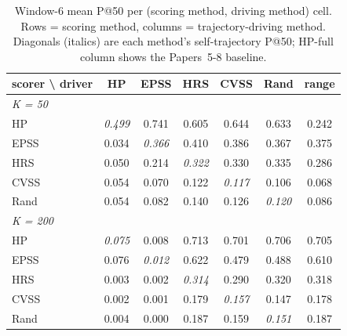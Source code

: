 \begin{table}[!t]
 \caption{Window-6 mean P@50 per (scoring method, driving method) cell. Rows = scoring method, columns = trajectory-driving method. Diagonals (italics) are each method's self-trajectory P@50; HP-full column shows the Papers~5-8 baseline.}
 \label{tab:w6grid}
 \centering
 \small
 \setlength{\tabcolsep}{5pt}
 \begin{tabular}{l ccccc c}
 \toprule
 \textbf{scorer} \textbackslash{} \textbf{driver}
 & HP & EPSS & HRS & CVSS & Rand & range \\
 \midrule
 \multicolumn{7}{l}{\textit{K = 50}} \\
 HP & \textit{0.499} & 0.741 & 0.605 & 0.644 & 0.633 & 0.242 \\
 EPSS & 0.034 & \textit{0.366} & 0.410 & 0.386 & 0.367 & 0.375 \\
 HRS & 0.050 & 0.214 & \textit{0.322} & 0.330 & 0.335 & 0.286 \\
 CVSS & 0.054 & 0.070 & 0.122 & \textit{0.117} & 0.106 & 0.068 \\
 Rand & 0.054 & 0.082 & 0.140 & 0.126 & \textit{0.120} & 0.086 \\
 \midrule
 \multicolumn{7}{l}{\textit{K = 200}} \\
 HP & \textit{0.075} & 0.008 & 0.713 & 0.701 & 0.706 & 0.705 \\
 EPSS & 0.076 & \textit{0.012} & 0.622 & 0.479 & 0.488 & 0.610 \\
 HRS & 0.003 & 0.002 & \textit{0.314} & 0.290 & 0.320 & 0.318 \\
 CVSS & 0.002 & 0.001 & 0.179 & \textit{0.157} & 0.147 & 0.178 \\
 Rand & 0.004 & 0.000 & 0.187 & 0.159 & \textit{0.151} & 0.187 \\
 \bottomrule
 \end{tabular}
\end{table}
